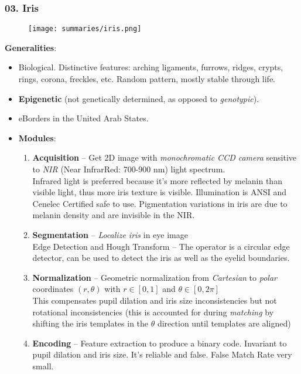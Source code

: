 \documentclass[a4paper]{article}
\begin{document}
    \subsubsection*{03. Iris}
      \begin{figure}[htp]
        \centering
          \texttt{[image: summaries/iris.png]}
      \end{figure}
      \textbf{Generalities}:
      \begin{itemize}
        \item Biological. Distinctive features: arching ligaments, furrows, ridges, crypts, rings, corona, freckles, etc. Random pattern, mostly stable through life.
        \item \textbf{Epigenetic} (not genetically determined, as opposed to \emph{genotypic}).
        \item eBorders in the United Arab States.
        \item\textbf{Modules}:
        \begin{enumerate}
          \item \textbf{Acquisition} -- Get 2D image with \emph{monochromatic CCD camera} sensitive to \emph{NIR} (Near InfrarRed: 700-900 nm) light spectrum.\\
          Infrared light is preferred because it's more reflected by melanin than visible light, thus more iris texture is visible. Illumination is ANSI and Cenelec Certified safe to use. Pigmentation variations in iris are due to melanin density and are invisible in the NIR.
          \item \textbf{Segmentation} -- \emph{Localize iris} in eye image\\
          Edge Detection and Hough Transform -- The operator is a circular edge detector, can be used to detect the iris as well as the eyelid boundaries.
          \item \textbf{Normalization} -- Geometric normalization from \emph{Cartesian} to \emph{polar} coordinates $(r,\theta)$ with $r\in [0,1]$ and $\theta\in [0,2\pi]$\\
          This compensates pupil dilation and iris size inconsistencies but not rotational inconsistencies (this is accounted for during \emph{matching} by shifting the iris templates in the $\theta$ direction until templates are aligned)
          \item \textbf{Encoding} -- Feature extraction to produce a binary code. Invariant to pupil dilation and iris size. It's reliable and false. False Match Rate very small.\\

\end{enumerate}
\end{itemize}
\end{document}
